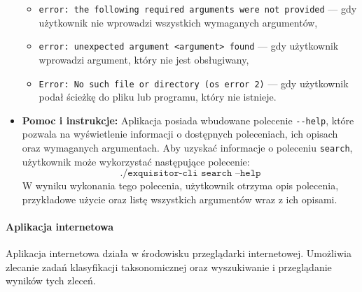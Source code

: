 \begin{itemize}
{\begin{itemize}
                            \item {
                                \texttt{error: the following required arguments were not provided} — gdy użytkownik nie wprowadzi wszystkich wymaganych argumentów,
                            }
                            \item {
                                \texttt{error: unexpected argument <argument> found} — gdy użytkownik wprowadzi argument, który nie jest obsługiwany,
                            }
                            \item {
                                \texttt{Error: No such file or directory (os error 2)} — gdy użytkownik podał ścieżkę do pliku lub programu, który nie istnieje.
                            }
                        \end{itemize}
                    }
                    \item {
                        \textbf{Pomoc i instrukcje:}
                        Aplikacja posiada wbudowane polecenie \texttt{-\phantom{}-help}, które pozwala na wyświetlenie informacji o dostępnych poleceniach, ich opisach oraz wymaganych argumentach.
                        Aby uzyskać informacje o poleceniu \texttt{search}, użytkownik może wykorzystać następujące polecenie: 
                        \[
                            \texttt{./exquisitor-cli search --help}
                        \]
                        W wyniku wykonania tego polecenia, użytkownik otrzyma opis polecenia, przykładowe użycie oraz listę wszystkich argumentów wraz z ich opisami.
                    }

                \end{itemize}

            \paragraph{Aplikacja internetowa}
                Aplikacja internetowa działa w środowisku przeglądarki internetowej. Umożliwia zlecanie zadań klasyfikacji taksonomicznej oraz wyszukiwanie i przeglądanie wyników tych zleceń.

